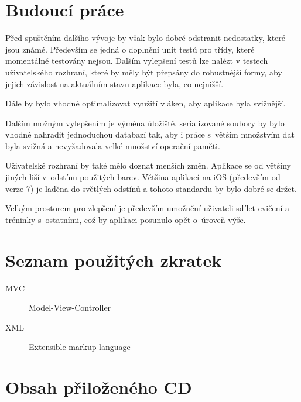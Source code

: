 \documentclass[thesis=B,czech]{FITthesis}[2012/06/26]
\begin{document}
\chapter{Budoucí práce}

	Před spuštěním dalšího vývoje by však bylo dobré odstranit nedostatky, které jsou známé. Především se jedná o doplnění unit testů pro třídy, které momentálně testovány nejsou. Dalším vylepšení testů lze nalézt v testech uživatelského rozhraní, které by měly být přepsány do robustnější formy, aby jejich závislost na aktuálním stavu aplikace byla, co nejnižší.

	Dále by bylo vhodné optimalizovat využití vláken, aby aplikace byla svižnější.

	Dalším možným vylepšením je výměna úložiště, serializované soubory by bylo vhodné nahradit jednoduchou databazí tak, aby i práce s~větším množstvím dat byla svižná a nevyžadovala velké množství operační paměti.

	Uživatelské rozhraní by také mělo doznat menších změn. Aplikace se od většiny jiných liší v~odstínu použitých barev. Většina aplikací na iOS (především od verze 7) je laděna do světlých odstínů a tohoto standardu by bylo dobré se držet.

	Velkým prostorem pro zlepšení je především umožnění uživateli sdílet cvičení a tréninky s~ostatními, což by aplikaci posunulo opět o~úroveň výše.




\appendix

\chapter{Seznam použitých zkratek}
\begin{description}
	\item[MVC] Model-View-Controller
	\item[XML] Extensible markup language
\end{description}

\chapter{Obsah přiloženého CD}


\end{document}
